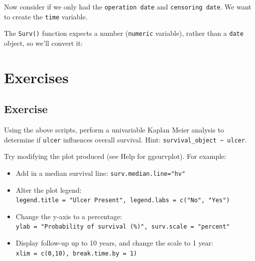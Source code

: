 \documentclass[
  12pt,
  krantz2]{krantz}
\makeatletter
\newenvironment{Shaded}{\begin{snugshade}}{\end{snugshade}}
\newcommand{\CommentTok}[1]{\textcolor[rgb]{0.56,0.35,0.01}{\textit{#1}}}
\newcommand{\DataTypeTok}[1]{\textcolor[rgb]{0.13,0.29,0.53}{#1}}
\newcommand{\KeywordTok}[1]{\textcolor[rgb]{0.13,0.29,0.53}{\textbf{#1}}}
\newcommand{\NormalTok}[1]{#1}
\newcommand{\OperatorTok}[1]{\textcolor[rgb]{0.81,0.36,0.00}{\textbf{#1}}}
\newcommand{\StringTok}[1]{\textcolor[rgb]{0.31,0.60,0.02}{#1}}
\providecommand{\tightlist}{%
  \setlength{\itemsep}{0pt}\setlength{\parskip}{0pt}}
\newenvironment{kframe}{%
\medskip{}
\setlength{\fboxsep}{.8em}
 \def\at@end@of@kframe{}%
 \ifinner\ifhmode%
  \def\at@end@of@kframe{\end{minipage}}%
  \begin{minipage}{\columnwidth}%
 \fi\fi%
 \def\FrameCommand##1{\hskip\@totalleftmargin \hskip-\fboxsep
 \colorbox{shadecolor}{##1}\hskip-\fboxsep
     \hskip-\linewidth \hskip-\@totalleftmargin \hskip\columnwidth}%
 \MakeFramed {\advance\hsize-\width
   \@totalleftmargin\z@ \linewidth\hsize
   \@setminipage}}%
 {\par\unskip\endMakeFramed%
 \at@end@of@kframe}
\renewenvironment{Shaded}{\begin{kframe}}{\end{kframe}}
\makeatother
\begin{document}
Now consider if we only had the \texttt{operation\ date} and \texttt{censoring\ date}.
We want to create the \texttt{time} variable.

\begin{Shaded}
\end{Shaded}

The \texttt{Surv()} function expects a number (\texttt{numeric} variable), rather than a \texttt{date} object, so we'll convert it:

\begin{Shaded}
\end{Shaded}

\hypertarget{exercises-5}{%
\section{Exercises}\label{exercises-5}}

\hypertarget{chap10-ex1}{%
\subsection{Exercise}\label{chap10-ex1}}

Using the above scripts, perform a univariable Kaplan Meier analysis to determine if \texttt{ulcer} influences overall survival. Hint: \texttt{survival\_object\ \textasciitilde{}\ ulcer}.

Try modifying the plot produced (see Help for ggsurvplot). For example:

\begin{itemize}
\tightlist
\item
  Add in a median survival line: \texttt{surv.median.line="hv"}
\item
  Alter the plot legend: \texttt{legend.title\ =\ "Ulcer\ Present",\ legend.labs\ =\ c("No",\ "Yes")}
\item
  Change the y-axis to a percentage: \texttt{ylab\ =\ "Probability\ of\ survival\ (\%)",\ surv.scale\ =\ "percent"}
\item
  Display follow-up up to 10 years, and change the scale to 1 year: \texttt{xlim\ =\ c(0,10),\ break.time.by\ =\ 1)}
\end{itemize}
\end{document}
